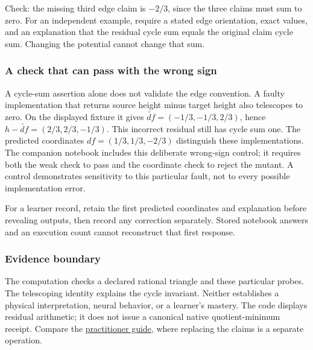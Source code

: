 \documentclass[
  11pt,
]{article}
\begin{document}
Check: the missing third edge claim is \(-2/3\), since the three claims
must sum to zero. For an independent example, require a stated edge
orientation, exact values, and an explanation that the residual cycle
sum equals the original claim cycle sum. Changing the potential cannot
change that sum.

\hypertarget{a-check-that-can-pass-with-the-wrong-sign}{%
\subsubsection{A check that can pass with the wrong
sign}\label{a-check-that-can-pass-with-the-wrong-sign}}

A cycle-sum assertion alone does not validate the edge convention. A
faulty implementation that returns source height minus target height
also telescopes to zero. On the displayed fixture it gives
\(\widetilde{df}=(-1/3,-1/3,2/3)\), hence
\(h-\widetilde{df}=(2/3,2/3,-1/3)\). This incorrect residual still has
cycle sum one. The predicted coordinates \(df=(1/3,1/3,-2/3)\)
distinguish these implementations. The companion notebook includes this
deliberate wrong-sign control; it requires both the weak check to pass
and the coordinate check to reject the mutant. A control demonstrates
sensitivity to this particular fault, not to every possible
implementation error.

For a learner record, retain the first predicted coordinates and
explanation before revealing outputs, then record any correction
separately. Stored notebook answers and an execution count cannot
reconstruct that first response.

\hypertarget{evidence-boundary}{%
\subsubsection{Evidence boundary}\label{evidence-boundary}}

The computation checks a declared rational triangle and these particular
probes. The telescoping identity explains the cycle invariant. Neither
establishes a physical interpretation, neural behavior, or a learner's
mastery. The code displays residual arithmetic; it does not issue a
canonical native quotient-minimum receipt. Compare the
\href{https://github.com/dbccpage/the_symbol_game/blob/52cb5457f6c485ba548cfd292f6012a941ed22cf/atlas/coda_atlas/symbol_game/005_pfp_practitioners_field_manual/paper.md}{practitioner
guide}, where replacing the claims is a separate operation.
\end{document}

